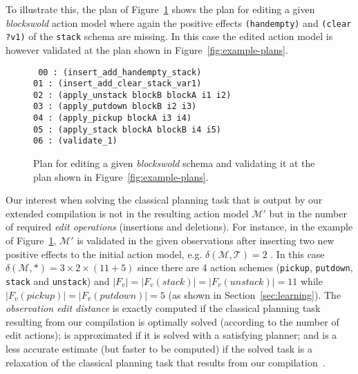 To illustrate this, the plan of Figure~\ref{fig:plan-pdistance} shows the plan for editing a given {\em blockswold} action model where again the positive effects {\tt\small (handempty)} and {\tt\small (clear ?v1)} of the {\tt\small stack} schema are missing. In this case the edited action model is however validated at the plan shown in Figure~\ref{fig:example-plans}.

\begin{figure}[hbt!]
{\tt\small
00 : (insert\_add\_handempty\_stack)\\
01 : (insert\_add\_clear\_stack\_var1)\\
02 : (apply\_unstack blockB blockA i1 i2)\\
03 : (apply\_putdown blockB i2 i3)\\
04 : (apply\_pickup blockA i3 i4)\\
05 : (apply\_stack blockA blockB i4 i5)\\
06 : (validate\_1)
}
 \caption{\small Plan for editing a given {\em blockswold} schema and validating it at the plan shown in Figure~\ref{fig:example-plans}.}
\label{fig:plan-pdistance}
\end{figure}

Our interest when solving the classical planning task that is output by our extended compilation is not in the resulting action model $\mathcal{M}'$ but in the number of required {\em edit operations} (insertions and deletions). For instance, in the example of Figure~\ref{fig:plan-pdistance}, $\mathcal{M}'$ is validated in the given observations after inserting two new positive effects to the initial action model, e.g. $\delta(\mathcal{M},\mathcal{T})=2$ . In this case $\delta(\mathcal{M},*)=3\times 2\times (11+5)$ since there are 4 action schemes ({\small\tt pickup}, {\small\tt putdown}, {\small\tt stack} and {\small\tt unstack}) and $|F_v|=|F_v(stack)|=|F_v(unstack)|=11$ while $|F_v(pickup)|=|F_v(putdown)|=5$  (as shown in Section~\ref{sec:learning}). The {\em observation edit distance} is exactly computed if the classical planning task resulting from our compilation is optimally solved (according to the number of edit actions); is approximated if it is solved with a satisfying planner; and is a less accurate estimate (but faster to be computed) if the solved task is a relaxation of the classical planning task that results from our compilation~\cite{bonet2001planning}.

